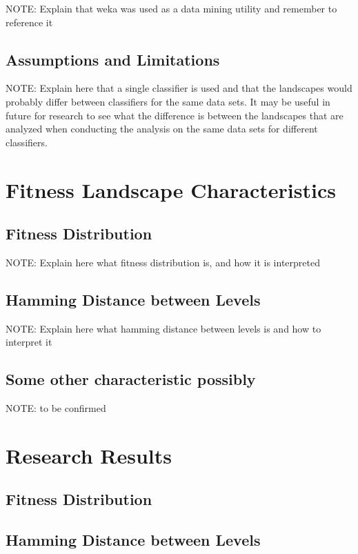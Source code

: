 \documentclass[journal,comsoc]{IEEEtran}
\begin{document}
NOTE: Explain that weka was used as a data mining utility and remember to reference it

\subsection{Assumptions and Limitations}

NOTE: Explain here that a single classifier is used and that the landscapes would probably differ between classifiers for the same data sets. It may be useful in future for research to see what the difference is between the landscapes that are analyzed when conducting the analysis on the same data sets for different classifiers. 

\section{Fitness Landscape Characteristics}
\subsection{Fitness Distribution}

NOTE: Explain here what fitness distribution is, and how it is interpreted

\subsection{Hamming Distance between Levels}

NOTE: Explain here what hamming distance between levels is and how to interpret it

\subsection{Some other characteristic possibly}

NOTE: to be confirmed

\section{Research Results}
\subsection{Fitness Distribution}
\subsection{Hamming Distance between Levels}
\end{document}
